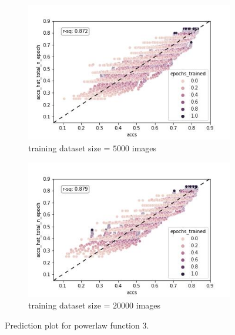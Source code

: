 \documentclass{article} %
\begin{document}
\begin{figure}
    \begin{subfigure}{.5\textwidth}
      \centering
      \includegraphics[width=.8\linewidth]{powerlaw_train_accs_hat_total_n_epoch}
      \caption{training dataset size = $5000$ images}
      \label{fig:powerlaw_accs_hat_total_n_epoch_train}
    \end{subfigure}%
    \begin{subfigure}{.5\textwidth}
      \centering
      \includegraphics[width=.8\linewidth]{powerlaw_val_accs_hat_total_n_epoch}
      \caption{training dataset size = $20000$ images}
      \label{fig:powerlaw_accs_hat_total_n_epoch_val}
    \end{subfigure}
    \caption{Prediction plot for powerlaw function 3.}
    \label{fig:powerlaw_accs_hat_total_n_epoch}
\end{figure}
\end{document}
